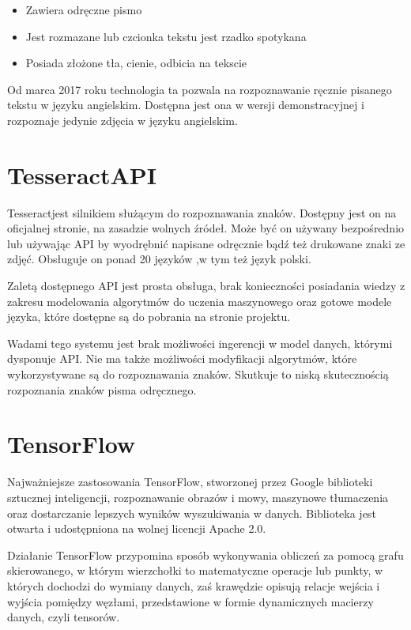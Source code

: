 \documentclass[brudnopis]{xmgr}
\begin{document}
\begin{itemize}
\item
Zawiera odręczne pismo
\item
Jest rozmazane lub czcionka tekstu jest rzadko spotykana
\item
Posiada złożone tła, cienie, odbicia na tekscie
\end{itemize}

Od marca 2017 roku technologia ta pozwala na rozpoznawanie ręcznie pisanego tekstu w języku angielskim. Dostępna jest ona w wersji demonstracyjnej i rozpoznaje jedynie zdjęcia w języku angielskim.

\section{TesseractAPI}

Tesseractjest silnikiem służącym do rozpoznawania znaków. Dostępny jest on na oficjalnej stronie\cite{10}, na zasadzie wolnych źródeł. Może być on używany bezpośrednio lub używając API by wyodrębnić napisane odręcznie bądź też drukowane znaki ze zdjęć. Obsługuje on ponad 20 języków ,w tym też język polski.

Zaletą dostępnego API jest prosta obsługa, brak konieczności posiadania wiedzy z zakresu modelowania algorytmów do uczenia maszynowego oraz gotowe modele języka, które dostępne są do pobrania na stronie projektu.

Wadami tego systemu jest brak możliwości ingerencji w model danych, którymi dysponuje API. Nie ma także możliwości modyfikacji algorytmów, które wykorzystywane są do rozpoznawania znaków. Skutkuje to niską skutecznością rozpoznania znaków pisma odręcznego.

\section{TensorFlow}

Najważniejsze zastosowania TensorFlow\cite{16}, stworzonej przez Google biblioteki sztucznej inteligencji, rozpoznawanie obrazów i mowy, maszynowe tłumaczenia oraz dostarczanie lepszych wyników wyszukiwania w danych. Biblioteka jest otwarta i udostępniona na wolnej licencji Apache 2.0.

Działanie TensorFlow przypomina sposób wykonywania obliczeń za pomocą grafu skierowanego, w którym wierzchołki to matematyczne operacje lub punkty, w których dochodzi do wymiany danych, zaś krawędzie opisują relacje wejścia i wyjścia pomiędzy węzłami, przedstawione w formie dynamicznych macierzy danych, czyli tensorów.
\end{document}
